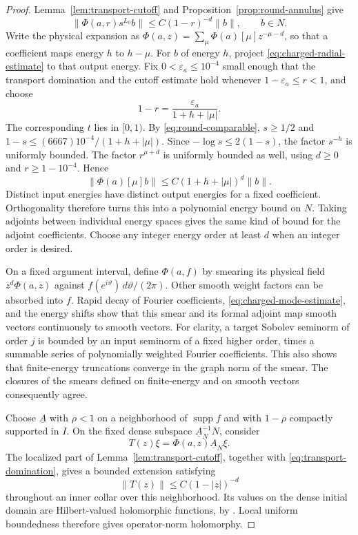 \begin{proof}
Lemma~\ref{lem:transport-cutoff} and
Proposition~\ref{prop:round-annulus} give
\begin{equation}\label{eq:charged-radial-estimate}
 \|\Phi(a,r)s^{L_0}b\|
      \leq C(1-r)^{-d}\|b\|,
 \qquad b\in N.
\end{equation}
Write the physical expansion as
$\Phi(a,z)=\sum_\mu\Phi(a)[\mu]z^{-\mu-d}$, so that a coefficient
maps energy $h$ to $h-\mu$.  For $b$ of energy $h$, project
\eqref{eq:charged-radial-estimate} to that output energy.  Fix
$0<\varepsilon_a\leq10^{-4}$ small enough that the transport domination
and the cutoff estimate hold whenever $1-\varepsilon_a\leq r<1$, and choose
\[
 1-r=\frac{\varepsilon_a}{1+h+|\mu|}.
\]
The corresponding $t$ lies in $[0,1)$.  By
\eqref{eq:round-comparable}, $s\geq1/2$ and
$1-s\leq(6667)10^{-4}/(1+h+|\mu|)$.
Since $-\log s\leq2(1-s)$, the factor $s^{-h}$ is uniformly bounded.
The factor $r^{\mu+d}$ is uniformly bounded as well, using $d\geq0$
and $r\geq1-10^{-4}$.  Hence
\begin{equation}\label{eq:charged-mode-estimate}
 \|\Phi(a)[\mu]b\|
     \leq C(1+h+|\mu|)^d\|b\|.
\end{equation}
Distinct input energies have distinct output energies for a fixed
coefficient.  Orthogonality therefore turns this into a polynomial
energy bound on $N$.  Taking adjoints between individual energy spaces
gives the same kind of bound for the adjoint coefficients.  Choose any
integer energy order at least $d$ when an integer order is desired.

On a fixed argument interval, define $\Phi(a,f)$ by smearing its physical
field $z^d\Phi(a,z)$ against $f(e^{i\vartheta})\,d\vartheta/(2\pi)$.
Other smooth weight factors can be absorbed into $f$.  Rapid decay of
Fourier coefficients, \eqref{eq:charged-mode-estimate}, and the energy
shifts show that this smear and its formal adjoint map smooth vectors
continuously to smooth vectors.  For clarity, a target Sobolev seminorm
of order $j$ is bounded by an input seminorm of a fixed higher order,
times a summable series of polynomially weighted Fourier coefficients.
This also shows that finite-energy truncations converge in the graph
norm of the smear.  The closures of the smears defined on finite-energy
and on smooth vectors consequently agree.

Choose $\underline A$ with $\rho<1$ on a neighborhood of
$\operatorname{supp}f$ and with $1-\rho$ compactly supported in $I$.
On the fixed dense subspace $\underline A_N^{-1}N$, consider
\[
 T(z)\xi=\Phi(a,z)\underline A_N\xi.
\]
The localized part of Lemma~\ref{lem:transport-cutoff}, together with
\eqref{eq:transport-domination}, gives a bounded extension satisfying
\begin{equation}\label{eq:charged-collar}
 \|T(z)\|\leq C(1-|z|)^{-d}
\end{equation}
throughout an inner collar over this neighborhood.  Its values on the
dense initial domain are Hilbert-valued holomorphic functions, by
\cite[Lemma~2.9 and Proposition~3.11]{TenerFusion}.
Local uniform boundedness therefore gives operator-norm holomorphy.


\end{proof}

